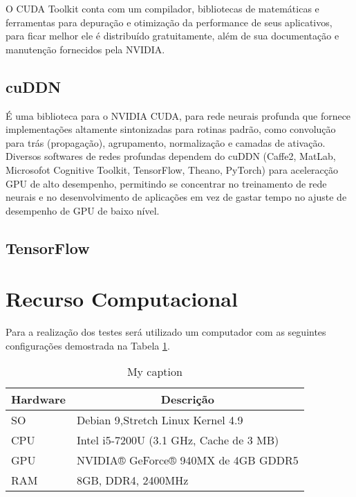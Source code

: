 \documentclass[conference]{IEEEtran}
\begin{document}
	O CUDA Toolkit conta com um compilador, bibliotecas de matem\'aticas e ferramentas para depura\c{c}\~ao e otimiza\c{c}\~ao da performance de seus aplicativos, para ficar melhor ele   \'e distribu\'ido gratuitamente, al\'em de sua documenta\c{c}\~ao e manuten\c{c}\~ao fornecidos pela NVIDIA.
	
	\subsection{cuDDN}
	\'E uma biblioteca para o NVIDIA CUDA, para rede neurais profunda que fornece implementa\c{c}\~oes altamente sintonizadas para rotinas padr\~ao, como convolu\c{c}\~ao para tr\'as (propaga\c{c}\~ao), agrupamento, normaliza\c{c}\~ao e camadas de ativa\c{c}\~ao.
	Diversos softwares de redes profundas dependem do cuDDN (Caffe2, MatLab, Microsofot Cognitive Toolkit, TensorFlow, Theano, PyTorch) para acelerac\c{c}\~ao GPU de alto desempenho, permitindo se concentrar no treinamento de rede neurais e no desenvolvimento de aplica\c{c}\~oes em vez de gastar tempo no ajuste de desempenho de GPU de baixo n\'ivel.
	
	\subsection{TensorFlow}
	
	
	\section{Recurso Computacional}
	Para a realiza\c{c}\~ao dos testes ser\'a utilizado um computador com as seguintes configura\c{c}\~oes demostrada na Tabela \ref{pc:pc1}.
	
	\begin{table}[]
		\centering
		\caption{My caption}
		\label{pc:pc1}
		\begin{tabular}{ll}
			\hline
			
			\textbf{Hardware} & \multicolumn{1}{c}{\textbf{Descrição}}  \\ \hline
			SO                & Debian 9,Stretch Linux Kernel 4.9       \\
			CPU               & Intel i5-7200U (3.1 GHz, Cache de 3 MB) \\
			GPU               & NVIDIA® GeForce® 940MX de 4GB GDDR5     \\
			RAM               & 8GB, DDR4, 2400MHz                      \\ \hline
		\end{tabular}
	\end{table}
	
\end{document}
